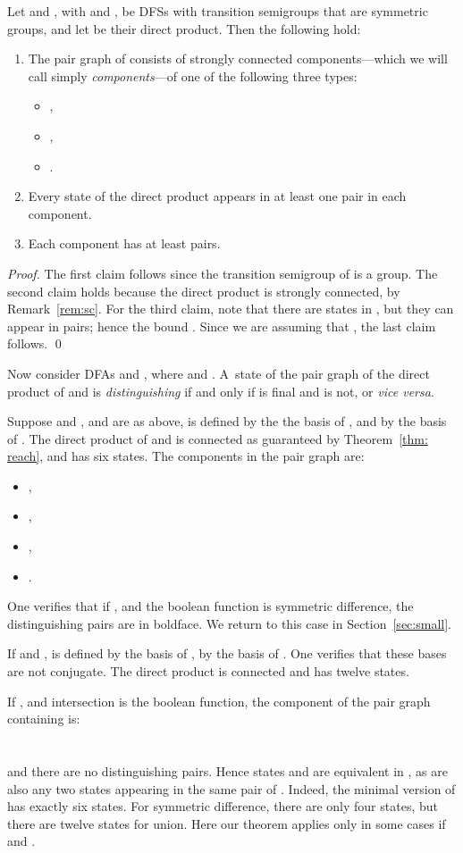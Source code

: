 \documentclass{llncs}
\newcommand{\bi}{\begin{itemize}}
\newcommand{\ei}{\end{itemize}}
\newcommand{\be}{\begin{enumerate}}
\newcommand{\ee}{\end{enumerate}}
\newcommand{\qedb}{\hfill}
\begin{document}
\begin{proposition}
\label{prop:pairgraph}
Let  and , with  and , be 
DFSs with transition semigroups  that are symmetric groups, and let  be their direct product.
Then the following hold:
\be
\item
The pair graph of  consists of strongly connected components---which we will call simply \emph{components}---of one of the following three types:
\bi
\item
, 
\item
, 
\item
. 
\ei
\item
Every state  of the direct product  appears in at least one pair in each component.\item
Each component has at least  pairs.
\ee
\end{proposition}
\begin{proof}
The first claim follows since the transition semigroup of  is a group.
The second claim holds because the direct product is strongly connected, by Remark~\ref{rem:sc}.
For the third claim, note that there are  states in , but they can appear in pairs; hence the bound . Since we are assuming that , the last claim follows.
\qed
\end{proof}

Now consider DFAs  and , where
 and .
A~state  of the pair graph of the direct product  of  and  is \emph{distinguishing} if and only if  is final and  is not, or \emph{vice versa}.

\begin{example}
\label{ex:23}
Suppose  and ,  and  are as above,  is defined by the the basis   of , and  by the basis  of .
The direct product of  and  is connected as guaranteed by Theorem~\ref{thm: reach}, and has six states. The
 components in the pair graph are:
\bi
\item
, 
\item
,
\item
, 
\item
.
\ei
One verifies that if ,  and the boolean function is symmetric difference,  the distinguishing pairs are  in boldface. 
We return to this case in Section~\ref{sec:small}.\qedb
\end{example}

\begin{example}
\label{ex:34}
If  and ,  is defined by the basis  of ,   by  the basis  of . One verifies that these bases are not conjugate.
The direct product   is connected and has twelve states.

If ,  and intersection is the boolean function,
the component of the pair graph containing  is:\\
\mbox{\hspace{1cm} } \\
\\
and there are no distinguishing pairs. Hence states  and  are equivalent in , as are also any two states appearing in the same pair of .
Indeed, the minimal version of  has exactly six states.
For symmetric difference, there are only four states, but there are twelve states for union.
Here our theorem applies only in some cases if  and .
\qedb
\end{example}
\end{document}
